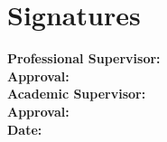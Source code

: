 \chapter*{Signatures}
\thispagestyle{plain}

\noindent\textbf{Professional Supervisor:} \dotfill\\[0.8em]
\textbf{Approval:} \dotfill\\[1.8em]

\noindent\textbf{Academic Supervisor:} \dotfill\\[0.8em]
\textbf{Approval:} \dotfill\\[1.8em]

\noindent\textbf{Date:} \dotfill
\cleardoublepage
